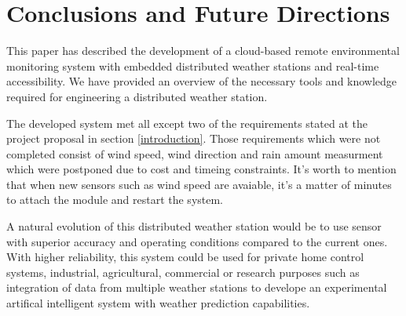\section{Conclusions and Future Directions}
This paper has described the development of a cloud-based remote environmental
monitoring system with embedded distributed weather stations and real-time accessibility.
We have provided an overview of the necessary tools and knowledge required
for engineering a distributed weather station.

The developed system met all except two of the requirements stated at the project proposal in section \ref{introduction}.
Those requirements which were not completed consist of wind speed, wind direction and rain amount measurment which
were postponed due to cost and timeing constraints. It's worth to mention that when new sensors such as wind speed are avaiable,
it's a matter of minutes to attach the module and restart the system.

A natural evolution of this distributed weather station would be to use sensor with superior
accuracy and operating conditions compared to the current ones. With higher reliability,
this system could be used for private home control systems, industrial, agricultural, commercial or research purposes such as integration of
data from multiple weather stations to develope an experimental artifical intelligent system
with weather prediction capabilities.
